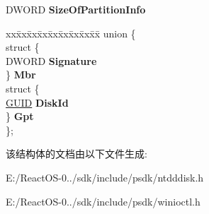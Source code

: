 \begin{DoxyCompactItemize}
\begin{tabbing}
\end{tabbing}\item 
\mbox{\label{struct___d_i_s_k___p_a_r_t_i_t_i_o_n___i_n_f_o_a61ee069f637fe66011d66c68b63ac40b}} 
D\+W\+O\+RD {\bfseries Size\+Of\+Partition\+Info}
\item 
\mbox{\label{struct___d_i_s_k___p_a_r_t_i_t_i_o_n___i_n_f_o_a48cd90d4f2f9eb6eb26cf1cc325e31bc}} 
\begin{tabbing}
xx\=xx\=xx\=xx\=xx\=xx\=xx\=xx\=xx\=\kill
union \{\\
\>struct \{\\
\>\>DWORD {\bfseries Signature}\\
\>\} {\bfseries Mbr}\\
\>struct \{\\
\>\>\hyperlink{interface_g_u_i_d}{GUID} {\bfseries DiskId}\\
\>\} {\bfseries Gpt}\\
\}; \\

\end{tabbing}\end{DoxyCompactItemize}


该结构体的文档由以下文件生成\+:\begin{DoxyCompactItemize}
\item 
E\+:/\+React\+O\+S-\/0../sdk/include/psdk/ntdddisk.\+h\item 
E\+:/\+React\+O\+S-\/0../sdk/include/psdk/winioctl.\+h\end{DoxyCompactItemize}
